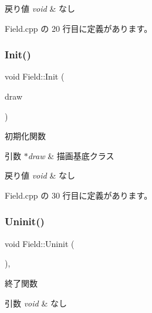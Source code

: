 \begin{DoxyRetVals}{戻り値}
{\em void} & なし \\
\hline
\end{DoxyRetVals}


 Field.\+cpp の 20 行目に定義があります。

\mbox{\label{class_field_a8360ab68eaf346984eab8bce4c37c3b3}} 
\subsubsection{\texorpdfstring{Init()}{Init()}}
{\footnotesize\ttfamily void Field\+::\+Init (\begin{DoxyParamCaption}\item[{\mbox{\hyperlink{class_draw_base}{Draw\+Base}} $\ast$}]{draw }\end{DoxyParamCaption})}



初期化関数 


\begin{DoxyParams}{引数}
{\em $\ast$draw} & 描画基底クラス \\
\hline
\end{DoxyParams}

\begin{DoxyRetVals}{戻り値}
{\em void} & なし \\
\hline
\end{DoxyRetVals}


 Field.\+cpp の 30 行目に定義があります。

\mbox{\label{class_field_a6d1015e2409daa87cd00485ac1efc06b}} 
\subsubsection{\texorpdfstring{Uninit()}{Uninit()}}
{\footnotesize\ttfamily void Field\+::\+Uninit (\begin{DoxyParamCaption}{ }\end{DoxyParamCaption})\hspace{0.3cm}{\ttfamily [override]}, {\ttfamily [virtual]}}



終了関数 


\begin{DoxyParams}{引数}
{\em void} & なし \\
\hline
\end{DoxyParams}


